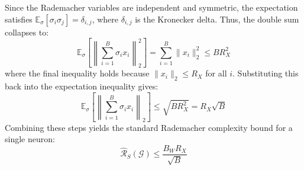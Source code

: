 \documentclass{article}
\theoremstyle{plain}
\theoremstyle{definition}
\theoremstyle{remark}
\begin{document}
Since the Rademacher variables are independent and symmetric, the expectation satisfies $\mathbb{E}_{\sigma}[\sigma_i \sigma_j] = \delta_{i, j}$, where $\delta_{i, j}$ is the Kronecker delta. Thus, the double sum collapses to:
\begin{equation}
\mathbb{E}_{\sigma} \left[ \left\| \sum_{i=1}^B \sigma_i x_i \right\|_2^2 \right] = \sum_{i=1}^B \|x_i\|_2^2 \le B R_X^2
\end{equation}
where the final inequality holds because $\|x_i\|_2 \le R_X$ for all $i$. Substituting this back into the expectation inequality gives:
\begin{equation}
\mathbb{E}_{\sigma} \left[ \left\| \sum_{i=1}^B \sigma_i x_i \right\|_2 \right] \le \sqrt{B R_X^2} = R_X \sqrt{B}
\end{equation}
Combining these steps yields the standard Rademacher complexity bound for a single neuron:
\begin{equation}
\widehat{\mathcal{R}}_S(\mathcal{G}) \le \frac{B_W R_X}{\sqrt{B}}
\end{equation}
\end{document}
